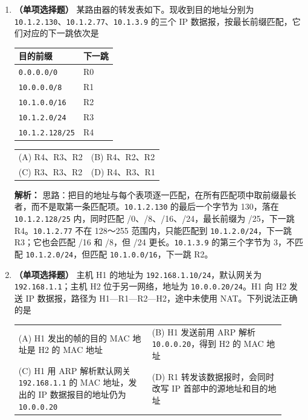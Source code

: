\begin{enumerate}[start=7]

\item \textbf{（单项选择题）} 某路由器的转发表如下。现收到目的地址分别为 \texttt{10.1.2.130}、\texttt{10.1.2.77}、\texttt{10.1.3.9} 的三个 IP 数据报，按最长前缀匹配，它们对应的下一跳依次是
\begin{center}
\begin{tabular}{ll}
\toprule
目的前缀 & 下一跳 \\
\midrule
\texttt{0.0.0.0/0} & R0 \\
\texttt{10.0.0.0/8} & R1 \\
\texttt{10.1.0.0/16} & R2 \\
\texttt{10.1.2.0/24} & R3 \\
\texttt{10.1.2.128/25} & R4 \\
\bottomrule
\end{tabular}
\end{center}
\begin{center}
\begin{tabular}{ll}
(A) R4、R3、R2 & (B) R4、R2、R2 \\[4pt]
(C) R3、R3、R2 & (D) R4、R3、R1
\end{tabular}
\end{center}

\ifshowsolutions\par\noindent\textbf{解析：} 思路：把目的地址与每个表项逐一匹配，在所有匹配项中取前缀最长者，而不是取第一条匹配项。\texttt{10.1.2.130} 的最后一个字节为 130，落在 \texttt{10.1.2.128/25} 内，同时匹配 /0、/8、/16、/24，最长前缀为 /25，下一跳 R4。\texttt{10.1.2.77} 不在 128～255 范围内，只能匹配到 \texttt{10.1.2.0/24}，下一跳 R3；它也会匹配 /16 和 /8，但 /24 更长。\texttt{10.1.3.9} 的第三个字节为 3，不匹配 \texttt{10.1.2.0/24}，但匹配 \texttt{10.1.0.0/16}，下一跳 R2。\else \answerarea[6] \fi

\item \textbf{（单项选择题）} 主机 H1 的地址为 \texttt{192.168.1.10/24}，默认网关为 \texttt{192.168.1.1}；主机 H2 位于另一网络，地址为 \texttt{10.0.0.20/24}。H1 向 H2 发送 IP 数据报，路径为 H1—R1—R2—H2，途中未使用 NAT。下列说法正确的是
\begin{center}
\begin{tabular}{p{0.46\linewidth}p{0.46\linewidth}}
(A) H1 发出的帧的目的 MAC 地址是 H2 的 MAC 地址 & (B) H1 发送前用 ARP 解析 \texttt{10.0.0.20}，得到 H2 的 MAC 地址 \\[4pt]
(C) H1 用 ARP 解析默认网关 \texttt{192.168.1.1} 的 MAC 地址，发出的 IP 数据报目的地址仍为 \texttt{10.0.0.20} & (D) R1 转发该数据报时，会同时改写 IP 首部中的源地址和目的地址
\end{tabular}
\end{center}


\end{enumerate}
